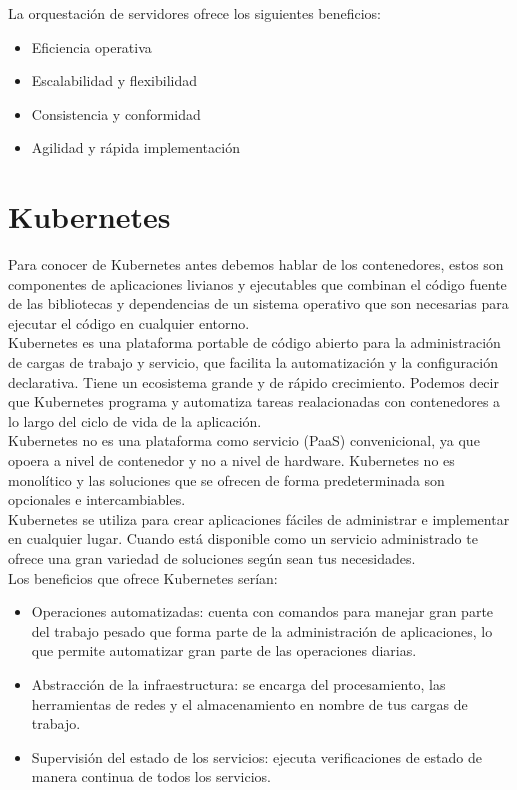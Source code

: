 \documentclass[12pt]{article}
\begin{document}
La orquestación de servidores ofrece los siguientes beneficios:
\begin{itemize}
\item Eficiencia operativa
\item Escalabilidad y flexibilidad
\item Consistencia y conformidad
\item Agilidad y rápida implementación
\end{itemize}

\section*{Kubernetes}
Para conocer de Kubernetes antes debemos hablar de los contenedores, estos son componentes de aplicaciones livianos y ejecutables que combinan el código fuente de las bibliotecas y dependencias de un sistema operativo que son necesarias para ejecutar el código en cualquier entorno.\\ 
Kubernetes es una plataforma portable de código abierto para la administración de cargas de trabajo y servicio, que facilita la automatización y la configuración declarativa. Tiene un ecosistema grande y de rápido crecimiento. Podemos decir que Kubernetes programa y automatiza tareas realacionadas con contenedores a lo largo del ciclo de vida de la aplicación.\\
Kubernetes no es una plataforma como servicio (PaaS) convenicional, ya que opoera a nivel de contenedor y no a nivel de hardware. Kubernetes no es monolítico y las soluciones que se ofrecen de forma predeterminada son opcionales e intercambiables.\\

Kubernetes se utiliza para crear aplicaciones fáciles de administrar e implementar en cualquier lugar. Cuando está disponible como un servicio administrado te ofrece una gran variedad de soluciones según sean tus necesidades.\\


Los beneficios que ofrece Kubernetes serían:
\begin{itemize}
\item Operaciones automatizadas: cuenta con comandos para manejar gran parte del trabajo pesado que forma parte de la administración de aplicaciones, lo que permite automatizar gran parte de las operaciones diarias.
\item Abstracción de la infraestructura: se encarga del procesamiento, las herramientas de redes y el almacenamiento en nombre de tus cargas de trabajo.
\item Supervisión del estado de los servicios: ejecuta verificaciones de estado de manera continua de todos los servicios.
\end{itemize}
\end{document}
